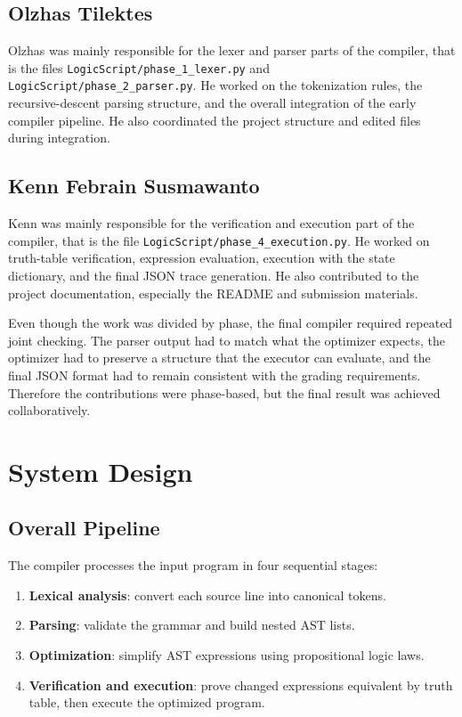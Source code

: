 \documentclass[11pt]{article}
\begin{document}
\subsection{Olzhas Tilektes}
Olzhas was mainly responsible for the lexer and parser parts of the compiler, that is the files \texttt{LogicScript/phase\_1\_lexer.py} and \texttt{LogicScript/phase\_2\_parser.py}. He worked on the tokenization rules, the recursive-descent parsing structure, and the overall integration of the early compiler pipeline. He also coordinated the project structure and edited files during integration.

\subsection{Kenn Febrain Susmawanto}
Kenn was mainly responsible for the verification and execution part of the compiler, that is the file \texttt{LogicScript/phase\_4\_execution.py}. He worked on truth-table verification, expression evaluation, execution with the state dictionary, and the final JSON trace generation. He also contributed to the project documentation, especially the README and submission materials.

Even though the work was divided by phase, the final compiler required repeated joint checking. The parser output had to match what the optimizer expects, the optimizer had to preserve a structure that the executor can evaluate, and the final JSON format had to remain consistent with the grading requirements. Therefore the contributions were phase-based, but the final result was achieved collaboratively.

\section{System Design}
\subsection{Overall Pipeline}
The compiler processes the input program in four sequential stages:
\begin{enumerate}
    \item \textbf{Lexical analysis}: convert each source line into canonical tokens.
    \item \textbf{Parsing}: validate the grammar and build nested AST lists.
    \item \textbf{Optimization}: simplify AST expressions using propositional logic laws.
    \item \textbf{Verification and execution}: prove changed expressions equivalent by truth table, then execute the optimized program.
\end{enumerate}
\end{document}
